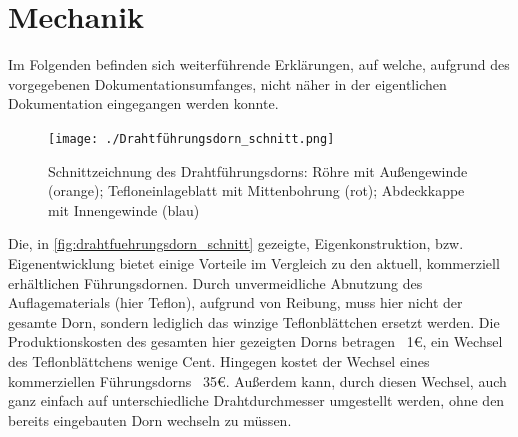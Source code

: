 \appendix

\section{Mechanik}
\label{appx:mechanik}

Im Folgenden befinden sich weiterführende Erklärungen, auf welche, aufgrund des vorgegebenen Dokumentationsumfanges, nicht näher in der eigentlichen Dokumentation eingegangen werden konnte. 

\begin{figure}[H]
    \centering
    \texttt{[image: ./Drahtführungsdorn\_schnitt.png]}
    \caption{Schnittzeichnung des Drahtführungsdorns: Röhre mit Außengewinde (orange); Tefloneinlageblatt mit Mittenbohrung (rot); Abdeckkappe mit Innengewinde (blau)}
    \label{fig:drahtfuehrungsdorn_schnitt}
\end{figure}

Die, in \autoref{fig:drahtfuehrungsdorn_schnitt} gezeigte, Eigenkonstruktion, bzw. Eigenentwicklung bietet einige Vorteile im Vergleich zu den aktuell, kommerziell erhältlichen Führungsdornen. Durch unvermeidliche Abnutzung des Auflagematerials (hier Teflon), aufgrund von Reibung, muss hier nicht der gesamte Dorn, sondern lediglich das winzige Teflonblättchen ersetzt werden. Die Produktionskosten des gesamten hier gezeigten Dorns betragen ~1€, ein Wechsel des Teflonblättchens wenige Cent. Hingegen kostet der Wechsel eines kommerziellen Führungsdorns ~35€. Außerdem kann, durch diesen Wechsel, auch ganz einfach auf unterschiedliche Drahtdurchmesser umgestellt werden, ohne den bereits eingebauten Dorn wechseln zu müssen.


